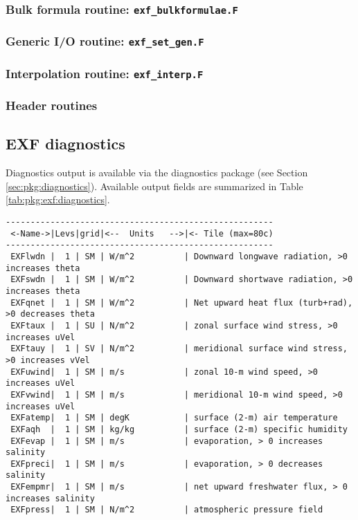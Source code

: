 \subsubsection{Bulk formula routine: \texttt{exf\_bulkformulae.F}}

\subsubsection{Generic I/O routine: \texttt{exf\_set\_gen.F}}

\subsubsection{Interpolation routine: \texttt{exf\_interp.F}}

\subsubsection{Header routines}


\subsection{EXF diagnostics
\label{sec:pkg:exf:diagnostics}}

Diagnostics output is available via the diagnostics package
(see Section \ref{sec:pkg:diagnostics}).
Available output fields are summarized in 
Table \ref{tab:pkg:exf:diagnostics}.

\begin{table}[h!]
\label{tab:pkg:exf:diagnostics}
{\footnotesize
\begin{verbatim}
------------------------------------------------------
 <-Name->|Levs|grid|<--  Units   -->|<- Tile (max=80c)
------------------------------------------------------
 EXFlwdn |  1 | SM | W/m^2          | Downward longwave radiation, >0 increases theta
 EXFswdn |  1 | SM | W/m^2          | Downward shortwave radiation, >0 increases theta
 EXFqnet |  1 | SM | W/m^2          | Net upward heat flux (turb+rad), >0 decreases theta
 EXFtaux |  1 | SU | N/m^2          | zonal surface wind stress, >0 increases uVel
 EXFtauy |  1 | SV | N/m^2          | meridional surface wind stress, >0 increases vVel
 EXFuwind|  1 | SM | m/s            | zonal 10-m wind speed, >0 increases uVel
 EXFvwind|  1 | SM | m/s            | meridional 10-m wind speed, >0 increases uVel
 EXFatemp|  1 | SM | degK           | surface (2-m) air temperature
 EXFaqh  |  1 | SM | kg/kg          | surface (2-m) specific humidity
 EXFevap |  1 | SM | m/s            | evaporation, > 0 increases salinity
 EXFpreci|  1 | SM | m/s            | evaporation, > 0 decreases salinity
 EXFempmr|  1 | SM | m/s            | net upward freshwater flux, > 0 increases salinity
 EXFpress|  1 | SM | N/m^2          | atmospheric pressure field
\end{verbatim}
}
\caption{~}
\end{table}

